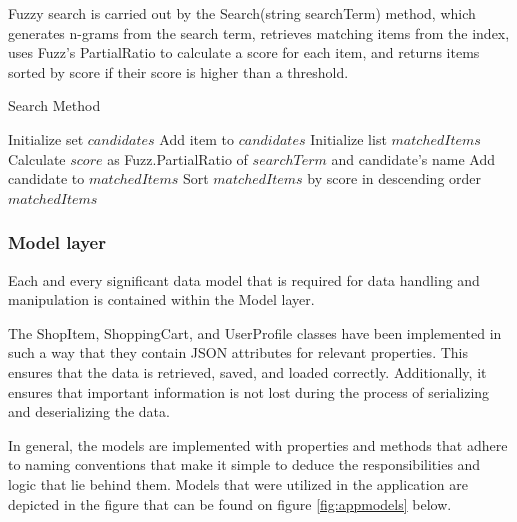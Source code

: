 Fuzzy search is carried out by the Search(string searchTerm) method, which generates n-grams from the search term, retrieves matching items from the index, uses Fuzz's PartialRatio to calculate a score for each item, and returns items sorted by score if their score is higher than a threshold.

\begin{algorithm}
	\caption{Search Method}
	\begin{algorithmic}
		\State Initialize set $candidates$
		\State Add item to $candidates$
		\EndFor
		\EndIf
		\EndFor
		\State Initialize list $matchedItems$
		\State Calculate $score$ as Fuzz.PartialRatio of $searchTerm$ and candidate's name
		\State Add candidate to $matchedItems$
		\EndIf
		\EndFor
		\State Sort $matchedItems$ by score in descending order
		\newline
		\Return $matchedItems$
	\end{algorithmic}
\end{algorithm}

\subsubsection{Model layer}

Each and every significant data model that is required for data handling and manipulation is contained within the Model layer. 

The ShopItem, ShoppingCart, and UserProfile classes have been implemented in such a way that they contain JSON attributes for relevant properties. This ensures that the data is retrieved, saved, and loaded correctly. Additionally, it ensures that important information is not lost during the process of serializing and deserializing the data. 

In general, the models are implemented with properties and methods that adhere to naming conventions that make it simple to deduce the responsibilities and logic that lie behind them. Models that were utilized in the application are depicted in the figure that can be found on figure \ref{fig:appmodels} below.

